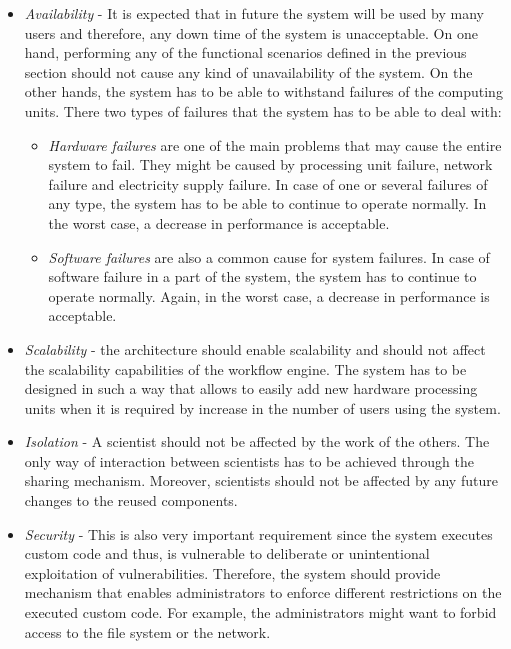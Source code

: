 \begin{itemize}

	\item \textit{Availability} - It is expected that in future the system will be used by many users and therefore, any down time of the system is unacceptable. On one hand, performing any of the functional scenarios defined in the previous section should not cause any kind of unavailability of the system. On the other hands, the system has to be able to withstand failures of the computing units. There two types of failures that the system has to be able to deal with:
	
	\begin{itemize}
	\item \textit{Hardware failures} are one of the main problems that may cause the entire system to fail. They might be caused by processing unit failure, network failure and electricity supply failure. In case of one or several failures of any type, the system has to be able to continue to operate normally. In the worst case, a decrease in performance is acceptable.
	\item \textit{Software failures} are also a common cause for system failures. In case of software failure in a part of the system, the system has to continue to operate normally. Again, in the worst case, a decrease in performance is acceptable. 
	\end{itemize}
	
	\item \textit{Scalability} - the architecture should enable scalability and should not affect the scalability capabilities of the workflow engine. The system has to be designed in such a way that allows to easily add new hardware processing units when it is required by increase in the number of users using the system.
	
	\item \textit{Isolation} - A scientist should not be affected by the work of the others. The only way of interaction between scientists has to be achieved through the sharing mechanism. Moreover, scientists should not be affected by any future changes to the reused components.
		
	\item \textit{Security} - This is also very important requirement since the system executes custom code and thus, is vulnerable to deliberate or unintentional exploitation of vulnerabilities. Therefore, the system should provide mechanism that enables administrators to enforce different restrictions on the executed custom code. For example, the administrators might want to forbid access to the file system or the network.
	

\end{itemize}
